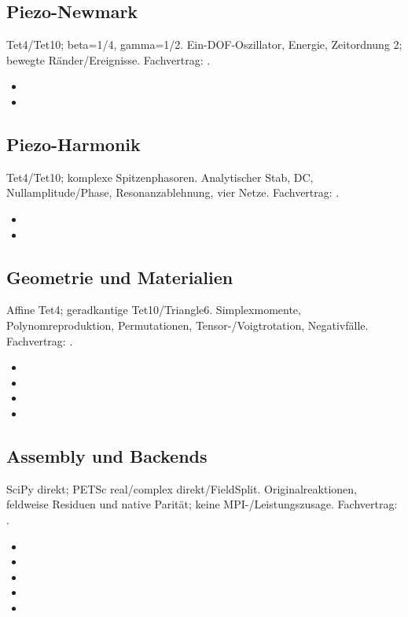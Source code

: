 \subsection{Piezo-Newmark}
\label{sec:vv-newmark}
Tet4/Tet10; beta=1/4, gamma=1/2. Ein-DOF-Oszillator, Energie, Zeitordnung 2; bewegte Ränder/Ereignisse.
Fachvertrag: .
\begin{itemize}
\item {}
\item {}
\end{itemize}
\subsection{Piezo-Harmonik}
\label{sec:vv-harmonic}
Tet4/Tet10; komplexe Spitzenphasoren. Analytischer Stab, DC, Nullamplitude/Phase, Resonanzablehnung, vier Netze.
Fachvertrag: .
\begin{itemize}
\item {}
\item {}
\end{itemize}
\subsection{Geometrie und Materialien}
\label{sec:vv-geometry}
Affine Tet4; geradkantige Tet10/Triangle6. Simplexmomente, Polynomreproduktion, Permutationen, Tensor-/Voigtrotation, Negativfälle.
Fachvertrag: .
\begin{itemize}
\item {}
\item {}
\item {}
\item {}
\end{itemize}
\subsection{Assembly und Backends}
\label{sec:vv-backends}
SciPy direkt; PETSc real/complex direkt/FieldSplit. Originalreaktionen, feldweise Residuen und native Parität; keine MPI-/Leistungszusage.
Fachvertrag: .
\begin{itemize}
\item {}
\item {}
\item {}
\item {}
\item {}
\end{itemize}

